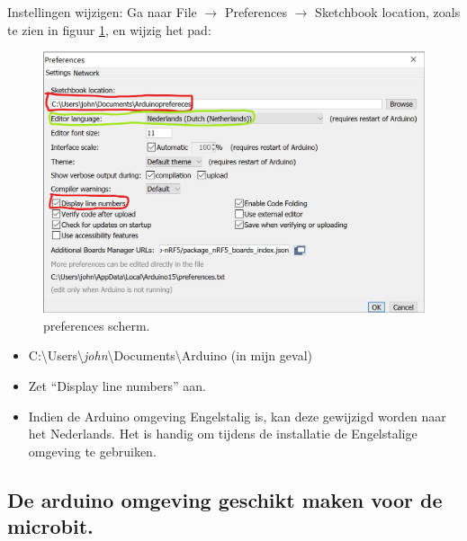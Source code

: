Instellingen wijzigen: Ga naar File $\rightarrow$ Preferences $\rightarrow$ Sketchbook location, zoals te zien in figuur \ref{fig:arduinoPref}, en wijzig het pad:
\begin{figure}[h!]
	\captionsetup{justification=centering}
	\includegraphics[width=0.50 \linewidth]{figuren/arduinoPref}
	\centering
	\caption{preferences scherm.}
	\label{fig:arduinoPref}
\end{figure}

\begin{itemize}
	\item C:\textbackslash Users\textbackslash \textit{john}\textbackslash Documents\textbackslash Arduino (in mijn geval)
	\item Zet “Display line numbers” aan.
	\item Indien de Arduino omgeving Engelstalig is, kan deze gewijzigd worden naar het Nederlands. Het is handig om tijdens de installatie de Engelstalige omgeving te gebruiken.
\end{itemize}


\subsection{De arduino omgeving geschikt maken voor de microbit.}


